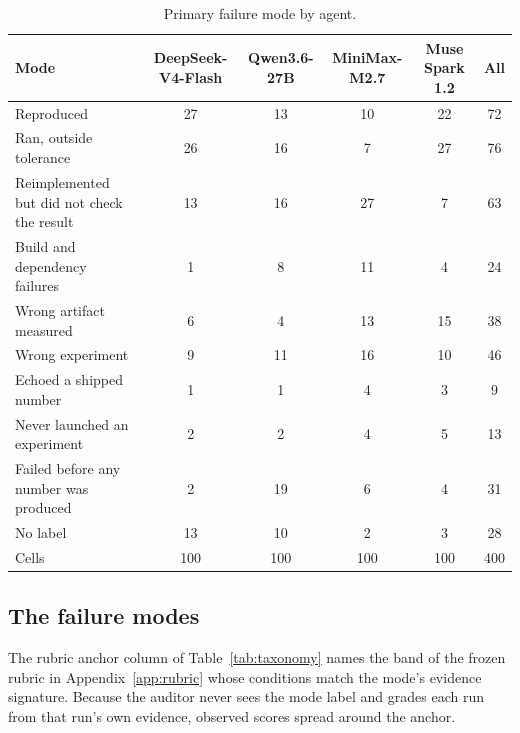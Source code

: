 \begin{table}[t]
\centering
\fontsize{8}{9.6}\selectfont
\setlength{\tabcolsep}{3.5pt}
\begin{tabular}{@{}lccccc@{}}
\toprule
Mode & DeepSeek-V4-Flash & Qwen3.6-27B & MiniMax-M2.7 & Muse Spark 1.2 & All \\
\midrule
Reproduced & 27 & 13 & 10 & 22 & 72 \\
Ran, outside tolerance & 26 & 16 & 7 & 27 & 76 \\
Reimplemented but did not check the result & 13 & 16 & 27 & 7 & 63 \\
Build and dependency failures & 1 & 8 & 11 & 4 & 24 \\
Wrong artifact measured & 6 & 4 & 13 & 15 & 38 \\
Wrong experiment & 9 & 11 & 16 & 10 & 46 \\
Echoed a shipped number & 1 & 1 & 4 & 3 & 9 \\
Never launched an experiment & 2 & 2 & 4 & 5 & 13 \\
Failed before any number was produced & 2 & 19 & 6 & 4 & 31 \\
No label & 13 & 10 & 2 & 3 & 28 \\
\midrule
Cells & 100 & 100 & 100 & 100 & 400 \\
\bottomrule
\end{tabular}
\caption{Primary failure mode by agent.}
\label{tab:failure-modes-by-agent}
\end{table}

\subsection{The failure modes}

The rubric anchor column of Table~\ref{tab:taxonomy} names the band of the
frozen rubric in Appendix~\ref{app:rubric} whose conditions match the mode's
evidence signature. Because the auditor never sees the mode label and grades
each run from that run's own evidence, observed scores spread around the
anchor.

